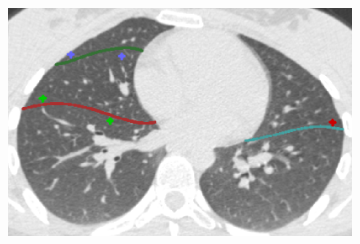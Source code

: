 {\begin{figure}[htbp] 
\centering
\begin{subfigure}{.44\linewidth}%
  \includegraphics[width=\linewidth,trim={{.0\wd0} {.0\wd0} {.0\wd0} {.0\wd0}},clip]{Segmentation/Image/BeforeManualCorrection.png}
  \caption{}
  \label{fig:ManualCorrection-a} 
\end{subfigure}
\vspace{.1in} %
\begin{subfigure}{.44\linewidth}%

\end{subfigure}
\end{figure}}
